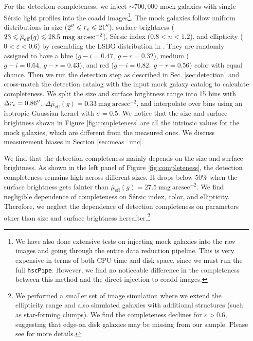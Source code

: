 \documentclass[twocolumn,astrosymb,twocolappendix]{aastex631}
\newcommand{\sbunit}{\mathrm{mag\ arcsec}^{-2}}
\newcommand{\sbeff}{\overline{\mu}_{\mathrm{eff}}(g)}
\newcommand{\code}[1]{\texttt{#1}}
\newcommand{\sersic}{S\'ersic}
\begin{document}
\begin{CJK*}{UTF8}{gbsn}
For the detection completeness, we inject $\sim 700,000$ mock galaxies with single \sersic{} light profiles \citep{Sersic1963} into the coadd images\footnote{We have also done extensive tests on injecting mock galaxies into the raw images and going through the entire data reduction pipeline. This is very expensive in terms of both CPU time and disk space, since we must run the full \code{hscPipe}. However, we find no noticeable difference in the completeness between this method and the direct injection to coadd images.}. The mock galaxies follow uniform distributions in size ($2\mbox{$^{\prime\prime}$} \leqslant r_{e} \leqslant 21\mbox{$^{\prime\prime}$}$), surface brightness ($23 \leqslant \overline{\mu}_{\rm eff}(g) \leqslant 28.5\ \mathrm{mag\ arcsec^{-2}}$), \sersic{} index ($0.8 < n < 1.2$), and ellipticity ($0 < \varepsilon < 0.6$) by resembling the LSBG distribution in . They are randomly assigned to have a blue ($g-i=0.47,\ g-r=0.32$), medium ($g-i=0.64,\ g-r=0.43$), and red ($g-i=0.82,\ g-r=0.56$) color with equal chance. Then we run the detection step as described in Sec. \ref{sec:detection} and cross-match the detection catalog with the input mock galaxy catalog to calculate completeness. We split the size and surface brightness range into 15 bins with $\Delta r_e = 0.86\mbox{$^{\prime\prime}$}$, $\Delta \sbeff = 0.33\ \sbunit$, and interpolate over bins using an isotropic Gaussian kernel with $\sigma = 0.5$. We notice that the size and surface brightness shown in Figure \ref{fig:completeness} are all the intrinsic values for the mock galaxies, which are different from the measured ones. We discuss measurement biases in Section \ref{sec:meas_unc}.

We find that the detection completeness mainly depends on the size and surface brightness. As shown in the left panel of Figure \ref{fig:completeness}, the detection completeness remains high across different sizes. It drops below 50\% when the surface brightness gets fainter than $\sbeff = 27.5\ \sbunit$. We find negligible dependence of completeness on \sersic{} index, color, and ellipticity. Therefore, we neglect the dependence of detection completeness on parameters other than size and surface brightness hereafter.\footnote{We performed a smaller set of image simulation where we extend the ellipticity range and also simulated galaxies with additional structures (such as star-forming clumps). We find the completeness declines for $\varepsilon > 0.6$, suggesting that edge-on disk galaxies may be missing from our sample. Please see \citet{Greene2022} for more details.}


\end{CJK*}
\end{document}
